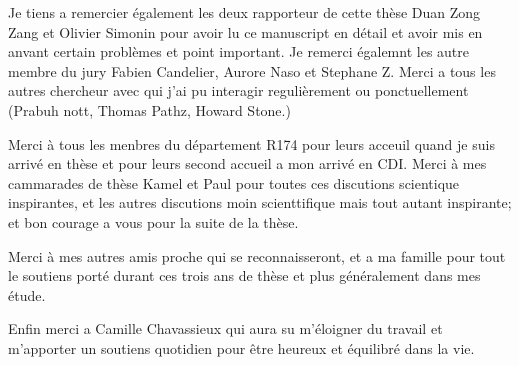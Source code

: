 Je tiens a remercier également les deux rapporteur de cette thèse Duan Zong Zang et Olivier Simonin pour avoir lu ce manuscript en détail et avoir mis en anvant certain problèmes et point important. 
Je remerci égalemnt les autre membre du jury Fabien Candelier, Aurore Naso et Stephane Z. 
Merci a tous les autres chercheur avec qui j'ai pu interagir regulièrement ou ponctuellement (Prabuh nott,  Thomas Pathz, Howard Stone.)


Merci à tous les menbres du département R174 pour leurs acceuil quand je suis arrivé en thèse et pour leurs second accueil a mon arrivé en CDI. 
Merci à mes cammarades de thèse Kamel et Paul pour toutes ces discutions scientique inspirantes, et les autres discutions moin scienttifique mais tout autant inspirante; et bon courage a vous pour la suite de la thèse. 

Merci à mes autres amis proche qui se reconnaisseront, et a ma famille pour tout le soutiens porté durant ces trois ans de thèse et plus généralement dans mes étude. 

Enfin merci a Camille Chavassieux qui aura su m'éloigner du travail et m'apporter un soutiens quotidien pour être heureux et équilibré dans la vie.  

\newpage